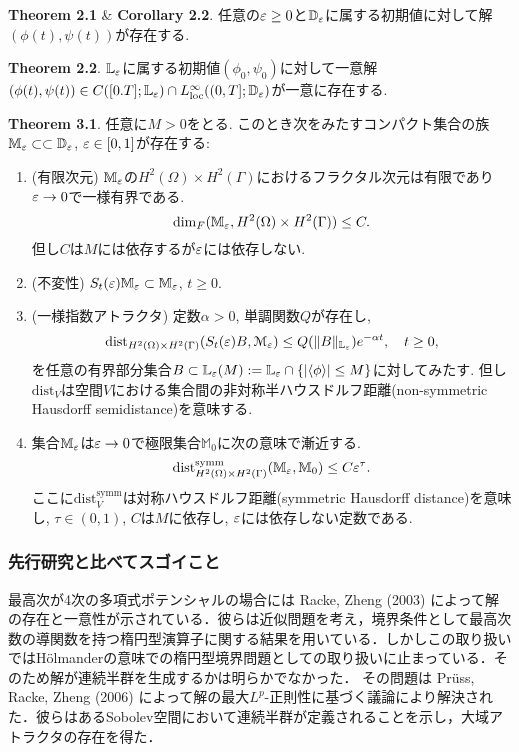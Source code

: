 \documentclass[a4paper]{article}
\begin{document}
		{\bf Theorem 2.1} \& {\bf Corollary 2.2}.
		任意の$\varepsilon\geq 0$と$\mathbb{D}_{\varepsilon}$に属する初期値に対して解$(\phi(t),\psi(t))$が存在する.

		{\bf Theorem 2.2}.
		$\mathbb{L}_{\varepsilon}$に属する初期値$(\phi_0,\psi_0)$に対して一意解$(\phi(t),\psi(t))\in C([0.T];\mathbb{L}_{\varepsilon}) \cap L^{\infty}_{\text{loc}}((0,T];\mathbb{D}_{\varepsilon})$が一意に存在する.

		{\bf Theorem 3.1}.
		任意に$M>0$をとる.
		このとき次をみたすコンパクト集合の族$\mathbb{M}_{\varepsilon}\subset\subset \mathbb{D}_{\varepsilon}$, $\varepsilon\in[0,1]$が存在する:
		\begin{enumerate}
			\item (有限次元) $\mathbb{M}_{\varepsilon}$の$H^2(\Omega)\times H^2(\Gamma)$におけるフラクタル次元は有限であり$\varepsilon\to 0$で一様有界である.
			\begin{equation}
				\dim_F(\mathbb{M}_{\varepsilon}, H^2(\Omega)\times H^2(\Gamma))\leq C.
			\end{equation}
			但し$C$は$M$には依存するが$\varepsilon$には依存しない.
			\item (不変性) $S_t(\varepsilon)\mathbb{M}_{\varepsilon} \subset \mathbb{M}_{\varepsilon}$, $t\geq 0$.
			\item (一様指数アトラクタ) 定数$\alpha>0$, 単調関数$Q$が存在し,
			\begin{equation}
				\mathrm{dist}_{H^2(\Omega)\times H^2(\Gamma)}(S_t(\varepsilon)B, \mathcal{M}_{\varepsilon}) \leq Q(\| B\|_{\mathbb{L}_{\varepsilon}})e^{-\alpha t},\quad t\geq 0,
			\end{equation}
			を任意の有界部分集合$B\subset \mathbb{L}_{\varepsilon}(M):=\mathbb{L}_{\varepsilon} \cap \{|\langle\phi\rangle|\leq M\}$に対してみたす.
			但し$\mathrm{dist}_V$は空間$V$における集合間の非対称半ハウスドルフ距離(non-symmetric Hausdorff semidistance)を意味する.
			\item 集合$\mathbb{M}_{\varepsilon}$は$\varepsilon\to 0$で極限集合$\mathbb{M}_0$に次の意味で漸近する.
			\begin{equation}
				\mathrm{dist}_{H^2(\Omega)\times H^2(\Gamma)}^{\text{symm}}(\mathbb{M}_{\varepsilon},\mathbb{M}_0)\leq C\varepsilon^{\tau}.
			\end{equation}
			ここに$\mathrm{dist}_V^{\text{symm}}$は対称ハウスドルフ距離(symmetric Hausdorff distance)を意味し, $\tau\in (0,1)$, $C$は$M$に依存し, $\varepsilon$には依存しない定数である.
		\end{enumerate}
	\subsubsection{先行研究と比べてスゴイこと}
		最高次が4次の多項式ポテンシャルの場合には Racke, Zheng (2003) \cite{RackeZheng2003} によって解の存在と一意性が示されている．彼らは近似問題を考え，境界条件として最高次数の導関数を持つ楕円型演算子に関する結果を用いている．しかしこの取り扱いではH\"olmanderの意味での楕円型境界問題としての取り扱いに止まっている．そのため解が連続半群を生成するかは明らかでなかった．
		その問題は Pr\"uss, Racke, Zheng (2006) \cite{PrussRackeZheng2006} によって解の最大$L^p$-正則性に基づく議論により解決された．彼らはあるSobolev空間において連続半群が定義されることを示し，大域アトラクタの存在を得た．
\end{document}
